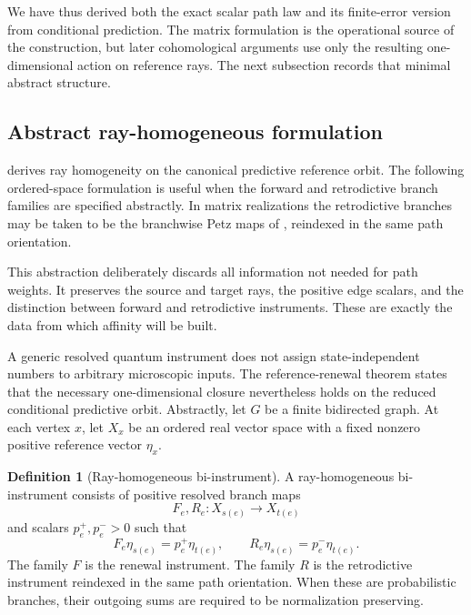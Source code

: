 \documentclass[11pt]{article}
\theoremstyle{definition}
\newtheorem{definition}[theorem]{Definition}
\theoremstyle{remark}
\begin{document}
We have thus derived both the exact scalar path law and its finite-error version
from conditional prediction.  The matrix formulation is the operational source
of the construction, but later cohomological arguments use only the resulting
one-dimensional action on reference rays.  The next subsection records that
minimal abstract structure.

\subsection{Abstract ray-homogeneous formulation}
\label{subsec:ray-homogeneous}

 derives ray homogeneity on the canonical
predictive reference orbit.  The following ordered-space formulation is useful
when the forward and retrodictive branch families are specified abstractly.
In matrix realizations the retrodictive branches may be taken to be the
branchwise Petz maps of
, reindexed in the same path
orientation.

This abstraction deliberately discards all information not needed for path
weights.  It preserves the source and target rays, the positive edge scalars, and
the distinction between forward and retrodictive instruments.  These are exactly
the data from which affinity will be built.

A generic resolved quantum instrument does not assign state-independent
numbers to arbitrary microscopic inputs.  The reference-renewal theorem states
that the necessary one-dimensional closure nevertheless holds on the reduced
conditional predictive orbit.  Abstractly, let $G$ be a finite bidirected graph.  At each vertex $x$, let $X_x$ be an
ordered real vector space with a fixed nonzero positive reference vector
$\eta_x$.

\begin{definition}[Ray-homogeneous bi-instrument]
\label{def:ray-bi-instrument}
A ray-homogeneous bi-instrument consists of positive resolved branch maps
\[
 F_e,R_e:X_{s(e)}\longrightarrow X_{t(e)}
\]
and scalars $p_e^+,p_e^->0$ such that
\[
 F_e\eta_{s(e)}=p_e^+\eta_{t(e)},
 \qquad
 R_e\eta_{s(e)}=p_e^-\eta_{t(e)}.
\]
The family $F$ is the renewal instrument.  The family $R$ is the retrodictive
instrument reindexed in the same path orientation.  When these are
probabilistic branches, their outgoing sums are required to be normalization
preserving.
\end{definition}
\end{document}
